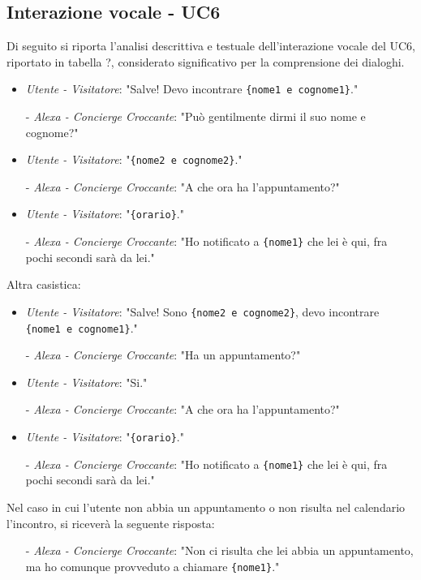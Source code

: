 \subsection{Interazione vocale - UC6}
Di seguito si riporta l'analisi descrittiva e testuale dell'interazione vocale del UC6, riportato in tabella ?, considerato significativo per la comprensione dei dialoghi.
\begin{itemize}
	\item \textit{Utente - Visitatore}: "Salve! Devo incontrare \texttt{\{nome1 e cognome1\}}."
	\item[-] \textit{Alexa - Concierge Croccante}:  "Può gentilmente dirmi il suo nome e cognome?" 
	\item \textit{Utente - Visitatore}: "\texttt{\{nome2 e cognome2\}}."
	\item[-] \textit{Alexa - Concierge Croccante}:  "A che ora ha l'appuntamento?"
	\item \textit{Utente - Visitatore}: "\texttt{\{orario\}}."
	\item[-] \textit{Alexa - Concierge Croccante}:  "Ho notificato a \texttt{\{nome1\}} che lei è qui, fra pochi secondi sarà da lei."
\end{itemize}
Altra casistica:
\begin{itemize}
	\item \textit{Utente - Visitatore}: "Salve! Sono \texttt{\{nome2 e cognome2\}}, devo incontrare \texttt{\{nome1 e cognome1\}}."
	\item[-] \textit{Alexa - Concierge Croccante}:  "Ha un appuntamento?"
	\item \textit{Utente - Visitatore}: "Si."
	\item[-] \textit{Alexa - Concierge Croccante}:  "A che ora ha l'appuntamento?"
	\item \textit{Utente - Visitatore}: "\texttt{\{orario\}}."
	\item[-] \textit{Alexa - Concierge Croccante}:  "Ho notificato a \texttt{\{nome1\}} che lei è qui, fra pochi secondi sarà da lei."
\end{itemize}
Nel caso in cui l'utente non abbia un appuntamento o non risulta nel calendario l'incontro, si riceverà la seguente risposta: 
\begin{itemize}
	\item[-] \textit{Alexa - Concierge Croccante}:  "Non ci risulta che lei abbia un appuntamento, ma ho comunque provveduto a chiamare \texttt{\{nome1\}}."
\end{itemize}
\newpage

